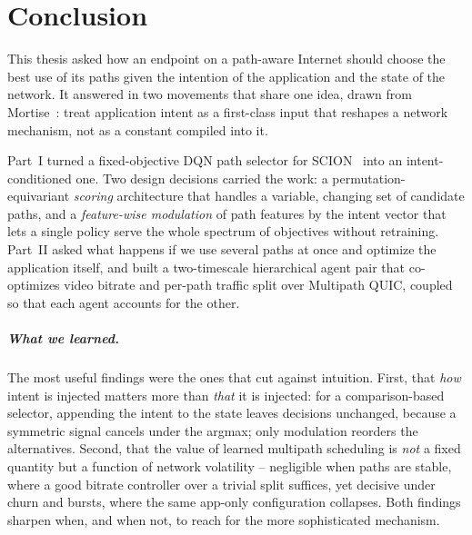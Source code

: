 \chapter{Conclusion}
\label{ch:conclusion}

This thesis asked how an endpoint on a path-aware Internet should choose the best use of its paths given
the intention of the application and the state of the network. It answered in two movements that share one
idea, drawn from Mortise~\cite{Shen2026}: treat application intent as a first-class input that reshapes a
network mechanism, not as a constant compiled into it.

Part~I turned a fixed-objective DQN path selector for SCION~\cite{Bourak2025} into an intent-conditioned
one. Two design decisions carried the work: a permutation-equivariant \emph{scoring} architecture that
handles a variable, changing set of candidate paths, and a \emph{feature-wise modulation} of path features
by the intent vector that lets a single policy serve the whole spectrum of objectives without retraining.
Part~II asked what happens if we use several paths at once and optimize the application itself, and built a
two-timescale hierarchical agent pair that co-optimizes video bitrate and per-path traffic split over
Multipath QUIC, coupled so that each agent accounts for the other.

\paragraph{What we learned.} The most useful findings were the ones that cut against intuition. First, that
\emph{how} intent is injected matters more than \emph{that} it is injected: for a comparison-based selector,
appending the intent to the state leaves decisions unchanged, because a symmetric signal cancels under the
argmax; only modulation reorders the alternatives. Second, that the value of learned multipath scheduling is
\emph{not} a fixed quantity but a function of network volatility -- negligible when paths are stable, where a
good bitrate controller over a trivial split suffices, yet decisive under churn and bursts, where the same
app-only configuration collapses. Both findings sharpen when, and when not, to reach for the more
sophisticated mechanism.

